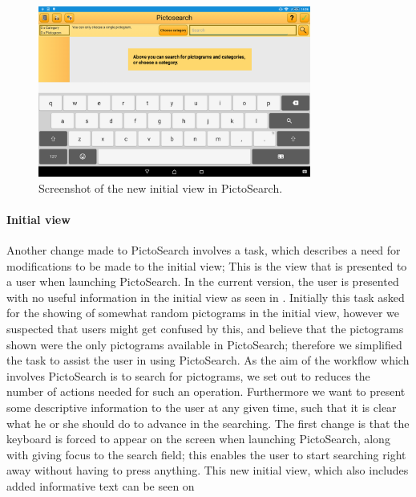 \begin{figure}[h]
    \centering
    \includegraphics[width=0.8\textwidth]{figures/img/screenshots/new_startup.png}
    \caption{Screenshot of the new initial view in PictoSearch.}\label{fig:screenshot_newstartup}
\end{figure}

\paragraph{Initial view}
Another change made to PictoSearch involves a task, which describes a need for modifications to be made to the initial view; This is the view that is presented to a user when launching PictoSearch.
In the current version, the user is presented with no useful information in the initial view as seen in .
Initially this task asked for the showing of somewhat random pictograms in the initial view, however we suspected that users might get confused by this, and believe that the pictograms shown were the only pictograms available in PictoSearch; therefore we simplified the task to assist the user in using PictoSearch.
As the aim of the workflow which involves PictoSearch is to search for pictograms, we set out to reduces the number of actions needed for such an operation. 
Furthermore we want to present some descriptive information to the user at any given time, such that it is clear what he or she should do to advance in the searching.
The first change is that the keyboard is forced to appear on the screen when launching PictoSearch, along with giving focus to the search field; this enables the user to start searching right away without having to press anything.
This new initial view, which also includes added informative text can be seen on 
